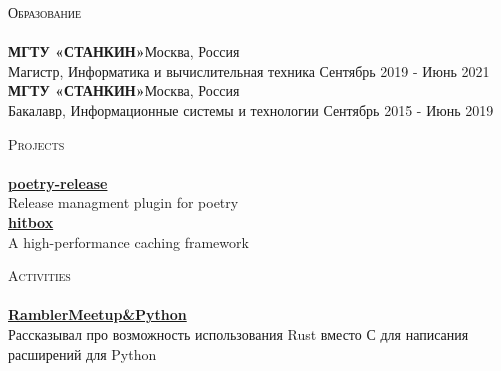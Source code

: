 \documentclass[a4paper]{article}
\newcommand{\lineunder} {
    \vspace*{-8pt} \\
    \hspace*{-18pt} \hrulefill \\
}
\newcommand{\header} [1] {
    {\hspace*{-18pt}\vspace*{6pt} \textsc{#1}}
    \vspace*{-6pt} \lineunder
}
\begin{document}
\header{Образование}
\textbf{МГТУ «СТАНКИН»}\hfill Москва, Россия\\
Магистр, Информатика и вычислительная техника \hfill Сентябрь 2019 - Июнь 2021\\
\vspace{2mm}
\textbf{МГТУ «СТАНКИН»}\hfill Москва, Россия\\
Бакалавр, Информационные системы и технологии \hfill Сентябрь 2015 - Июнь 2019\\
\vspace{2mm}

\newpage

\header{Projects}
{\textbf{\href{https://github.com/topenkoff/poetry-release}{poetry-release}}}\\
Release managment plugin for poetry\\

\vspace*{2mm}
{\textbf{\href{https://github.com/hit-box/hitbox}{hitbox}}}\\
A high-performance caching framework\\
\vspace*{2mm}


\header{Activities}
{\textbf{\href{https://www.youtube.com/watch?v=gpf_KOAmgzY&t=3040s}{RamblerMeetup\&Python}}}\\
Рассказывал про возможность использования Rust вместо С для написания расширений для Python
\vspace*{2mm}
\end{document}
